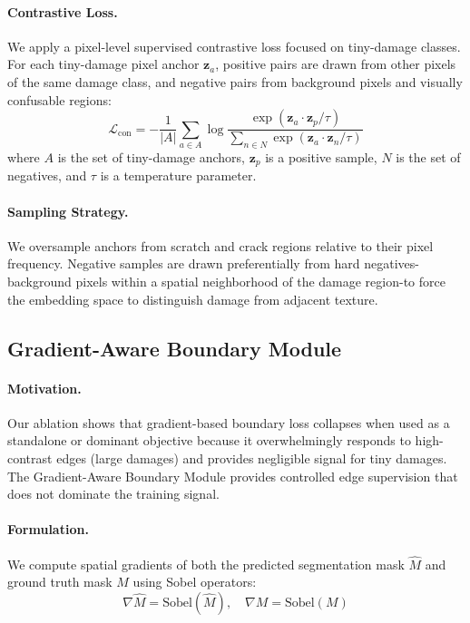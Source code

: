 \documentclass[10pt,twocolumn]{article}
\begin{document}
\paragraph{Contrastive Loss.} We apply a pixel-level supervised contrastive loss focused on tiny-damage classes. For each tiny-damage pixel anchor $\mathbf{z}_a$, positive pairs are drawn from other pixels of the same damage class, and negative pairs from background pixels and visually confusable regions:
\begin{equation}
    \mathcal{L}_{\text{con}} = -\frac{1}{|A|} \sum_{a \in A} \log \frac{\exp(\mathbf{z}_a \cdot \mathbf{z}_p / \tau)}{\sum_{n \in N} \exp(\mathbf{z}_a \cdot \mathbf{z}_n / \tau)}
\end{equation}
where $A$ is the set of tiny-damage anchors, $\mathbf{z}_p$ is a positive sample, $N$ is the set of negatives, and $\tau$ is a temperature parameter.

\paragraph{Sampling Strategy.} We oversample anchors from scratch and crack regions relative to their pixel frequency. Negative samples are drawn preferentially from hard negatives-background pixels within a spatial neighborhood of the damage region-to force the embedding space to distinguish damage from adjacent texture.

\subsection{Gradient-Aware Boundary Module}

\paragraph{Motivation.} Our ablation shows that gradient-based boundary loss collapses when used as a standalone or dominant objective because it overwhelmingly responds to high-contrast edges (large damages) and provides negligible signal for tiny damages. The Gradient-Aware Boundary Module provides controlled edge supervision that does not dominate the training signal.

\paragraph{Formulation.} We compute spatial gradients of both the predicted segmentation mask $\hat{M}$ and ground truth mask $M$ using Sobel operators:
\begin{equation}
    \nabla\hat{M} = \text{Sobel}(\hat{M}), \quad \nabla M = \text{Sobel}(M)
\end{equation}
\end{document}
